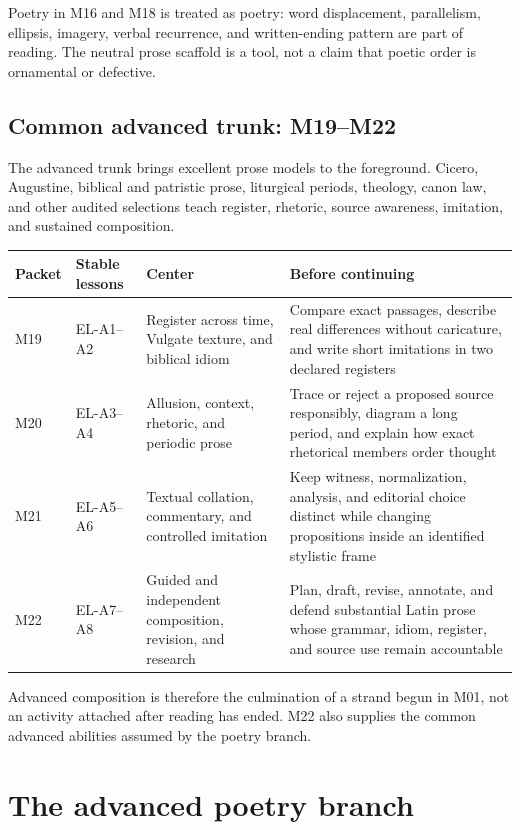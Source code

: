 Poetry in M16 and M18 is treated as poetry: word displacement, parallelism,
ellipsis, imagery, verbal recurrence, and written-ending pattern are part of
reading. The neutral prose scaffold is a tool, not a claim that poetic order
is ornamental or defective.

\section{Common advanced trunk: M19--M22}

The advanced trunk brings excellent prose models to the foreground. Cicero,
Augustine, biblical and patristic prose, liturgical periods, theology, canon
law, and other audited selections teach register, rhetoric, source awareness,
imitation, and sustained composition.

\begin{xltabular}{\linewidth}{@{}P{0.55in}P{1.1in}P{2.0in}Y@{}}
  \toprule
  \textbf{Packet} & \textbf{Stable lessons} & \textbf{Center} & \textbf{Before continuing} \\
  \midrule\endhead
  M19 & EL-A1--A2 & Register across time, Vulgate texture, and biblical idiom &
  Compare exact passages, describe real differences without caricature, and
  write short imitations in two declared registers \\
  M20 & EL-A3--A4 & Allusion, context, rhetoric, and periodic prose & Trace or
  reject a proposed source responsibly, diagram a long period, and explain how
  exact rhetorical members order thought \\
  M21 & EL-A5--A6 & Textual collation, commentary, and controlled imitation &
  Keep witness, normalization, analysis, and editorial choice distinct while
  changing propositions inside an identified stylistic frame \\
  M22 & EL-A7--A8 & Guided and independent composition, revision, and research &
  Plan, draft, revise, annotate, and defend substantial Latin prose whose
  grammar, idiom, register, and source use remain accountable \\
  \bottomrule
\end{xltabular}

Advanced composition is therefore the culmination of a strand begun in M01,
not an activity attached after reading has ended. M22 also supplies the common
advanced abilities assumed by the poetry branch.

\chapter{The advanced poetry branch}

